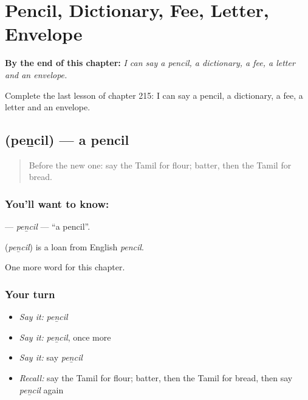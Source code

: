
\chapter{Pencil, Dictionary, Fee, Letter, Envelope}
\label{ch:ta-pencil-dictionary-fee-letter-envelope}

\begin{chapteropening}
\textbf{By the end of this chapter:} \emph{I can say a pencil, a dictionary, a fee, a letter and an envelope.}

Complete the last lesson of chapter 215: I can say a pencil, a dictionary, a fee, a letter and an envelope.
\end{chapteropening}

\section[\texorpdfstring{\ta{பென்சில்} (peṉcil)}{பென்சில் (peṉcil)}]{ (peṉcil) — a pencil}

\label{lesson:TA-C215-pencil}



\begin{quote}
Before the new one: say the Tamil for flour; batter, then the Tamil for bread.
\end{quote}

\subsection*{You'll want to know: }
\textbf{} — \emph{peṉcil} — \textquotedblleft{}a pencil\textquotedblright{}.

\begin{cousinweb}
\textbf{} (\emph{peṉcil}) is a loan from English \emph{pencil}.
\end{cousinweb}

\begin{grammarlens}[title={What you've built}]
One more word for this chapter.
\end{grammarlens}

\subsection*{Your turn}
\begin{itemize}
\raggedright
  \item \emph{Say it:} \emph{peṉcil}
  \item \emph{Say it:} \emph{peṉcil}, once more
  \item \emph{Say it:} say \emph{peṉcil}
  \item \emph{Recall:} say the Tamil for flour; batter, then the Tamil for bread, then say \emph{peṉcil} again
\end{itemize}

